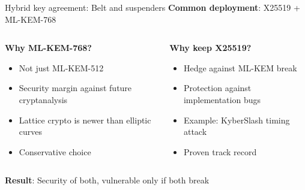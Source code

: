 \documentclass[aspectratio=169, lualatex, handout]{beamer}
\begin{document}
\begin{frame}{Hybrid key agreement: Belt and suspenders}
	\textbf{Common deployment}: X25519 + ML-KEM-768
	\vspace{3mm}
	\begin{columns}[c]
		\begin{column}{0.5\textwidth}
			\textbf{Why ML-KEM-768?}
			\begin{itemize}
				\item Not just ML-KEM-512
				\item Security margin against future cryptanalysis
				\item Lattice crypto is newer than elliptic curves
				\item Conservative choice
			\end{itemize}
		\end{column}
		\begin{column}{0.5\textwidth}
			\textbf{Why keep X25519?}
			\begin{itemize}
				\item Hedge against ML-KEM break
				\item Protection against implementation bugs
				\item Example: KyberSlash timing attack
				\item Proven track record
			\end{itemize}
		\end{column}
	\end{columns}
	\vspace{5mm}
	\begin{center}
		\textbf{Result}: Security of both, vulnerable only if both break
	\end{center}
\end{frame}
\end{document}
